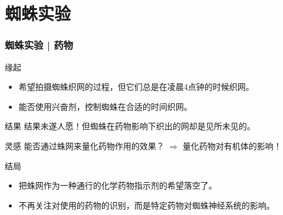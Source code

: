 \section{蜘蛛实验}
\begin{frame}
  \frametitle{蜘蛛实验 | 药物}
  \begin{block}{缘起}
    \begin{itemize}
      \item 希望拍摄蜘蛛织网的过程，但它们总是在凌晨4点钟的时候织网。
      \item 能否使用兴奋剂，控制蜘蛛在合适的时间织网。
    \end{itemize}
  \end{block}
  \pause
  \begin{block}{结果}
    结果未遂人愿！但蜘蛛在药物影响下织出的网却是见所未见的。
  \end{block}
  \pause
  \begin{block}{灵感}
    能否通过蛛网来量化药物作用的效果？ $\Rightarrow$ 量化药物对有机体的影响！
  \end{block}
  \pause
  \begin{block}{结局}
    \begin{itemize}
      \item 把蛛网作为一种通行的化学药物指示剂的希望落空了。
      \item 不再关注对使用的药物的识别，而是特定药物对蜘蛛神经系统的影响。
    \end{itemize}
  \end{block}
\end{frame}

